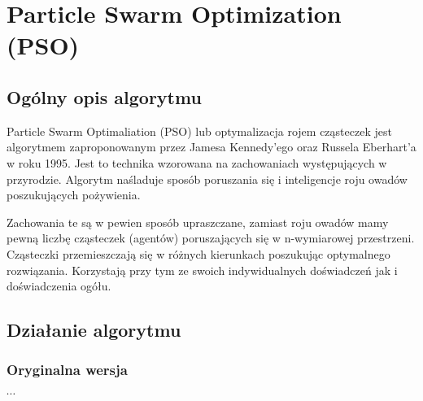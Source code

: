 
\section{Particle Swarm Optimization (PSO)}
\author{Paweł Jastrzębski}
\subsection{Ogólny opis algorytmu}
\par Particle Swarm Optimaliation (PSO) lub optymalizacja rojem cząsteczek jest algorytmem zaproponowanym przez Jamesa Kennedy'ego oraz Russela Eberhart'a w roku 1995. Jest to technika wzorowana na zachowaniach występujących w przyrodzie. Algorytm naśladuje sposób poruszania się i inteligencje roju owadów poszukujących pożywienia. 
\par Zachowania te są w pewien sposób upraszczane, zamiast roju owadów mamy pewną liczbę cząsteczek (agentów) poruszających się w n-wymiarowej przestrzeni. Cząsteczki przemieszczają się w różnych kierunkach poszukując optymalnego rozwiązania. Korzystają przy tym ze swoich indywidualnych doświadczeń jak i doświadczenia ogółu.
\subsection{Działanie algorytmu}
\subsubsection{Oryginalna wersja}
$\cdots$

